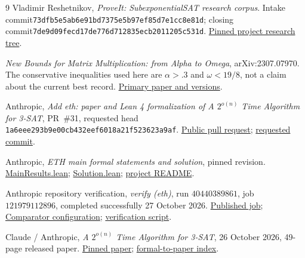 \documentclass[11pt,letterpaper]{article}
\theoremstyle{remark}\newtheorem{remark}[theorem]{Remark}
\newcommand{\Pin}{73dfb5e5ab6e91bd7375e5b97ef85d7e1cc8e81d}
\newcommand{\ClosingPin}{7de9d09fecd17de776d712835ecb2011205c531d}
\newcommand{\APin}{1a6eee293b9e00cb432eef6018a21f523623a9af}
\begin{document}
\begin{thebibliography}{9}
Vladimir Reshetnikov, \emph{ProveIt: SubexponentialSAT research corpus}. Intake commit\newline \texttt{\Pin}; closing commit\newline \texttt{\ClosingPin}.\newline
\href{https://github.com/VladimirReshetnikov/ProveIt/tree/7de9d09fecd17de776d712835ecb2011205c531d/Computability/SubexponentialSAT}{Pinned project research tree}.

\emph{New Bounds for Matrix Multiplication: from Alpha to Omega}, arXiv:2307.07970. The conservative inequalities used here are $\alpha>.3$ and $\omega<19/8$, not a claim about the current best record.\newline
\href{https://arxiv.org/abs/2307.07970}{Primary paper and versions}.

Anthropic, \emph{Add eth: paper and Lean 4 formalization of A $2^{o(n)}$ Time Algorithm for 3-SAT}, PR~\#31, requested head \texttt{\APin}.\newline
\href{https://github.com/anthropics/formal-math/pull/31}{Public pull request};
\href{https://github.com/anthropics/formal-math/commit/1a6eee293b9e00cb432eef6018a21f523623a9af}{requested commit}.

Anthropic, \emph{ETH main formal statements and solution}, pinned revision.\newline
\href{https://github.com/anthropics/formal-math/blob/1a6eee293b9e00cb432eef6018a21f523623a9af/eth/MainResults.lean}{MainResults.lean};
\href{https://github.com/anthropics/formal-math/blob/1a6eee293b9e00cb432eef6018a21f523623a9af/eth/Solution.lean}{Solution.lean};
\href{https://github.com/anthropics/formal-math/blob/1a6eee293b9e00cb432eef6018a21f523623a9af/eth/README.md}{project README}.

Anthropic repository verification, \emph{verify (eth)}, run $40440389861$, job $121979112896$, completed successfully 27 October 2026.\newline
\href{https://github.com/anthropics/formal-math/actions/runs/40440389861/job/121979112896}{Published job};
\href{https://github.com/anthropics/formal-math/blob/1a6eee293b9e00cb432eef6018a21f523623a9af/eth/comparator.json}{Comparator configuration};
\href{https://github.com/anthropics/formal-math/blob/1a6eee293b9e00cb432eef6018a21f523623a9af/.github/scripts/comparator-check.sh}{verification script}.

Claude / Anthropic, \emph{A $2^{o(n)}$ Time Algorithm for 3-SAT}, 26 October 2026, 49-page released paper.\newline
\href{https://github.com/anthropics/formal-math/blob/1a6eee293b9e00cb432eef6018a21f523623a9af/eth/paper.pdf}{Pinned paper};
\href{https://github.com/anthropics/formal-math/blob/1a6eee293b9e00cb432eef6018a21f523623a9af/eth/proof/PaperIndex.lean}{formal-to-paper index}.
\end{thebibliography}
\end{document}
